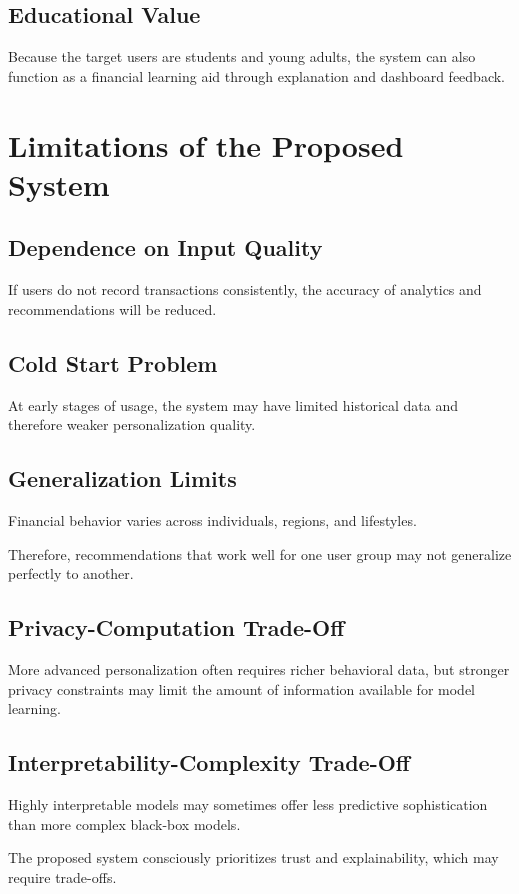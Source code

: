 \documentclass[12pt,a4paper]{report}
\begin{document}
\subsection{Educational Value}
Because the target users are students and young adults,
the system can also function as a financial learning aid through explanation and dashboard feedback.

\section{Limitations of the Proposed System}
\subsection{Dependence on Input Quality}
If users do not record transactions consistently,
the accuracy of analytics and recommendations will be reduced.

\subsection{Cold Start Problem}
At early stages of usage,
the system may have limited historical data and therefore weaker personalization quality.

\subsection{Generalization Limits}
Financial behavior varies across individuals,
regions,
and lifestyles.

Therefore,
recommendations that work well for one user group may not generalize perfectly to another.

\subsection{Privacy-Computation Trade-Off}
More advanced personalization often requires richer behavioral data,
but stronger privacy constraints may limit the amount of information available for model learning.

\subsection{Interpretability-Complexity Trade-Off}
Highly interpretable models may sometimes offer less predictive sophistication than more complex black-box models.

The proposed system consciously prioritizes trust and explainability,
which may require trade-offs.
\end{document}
